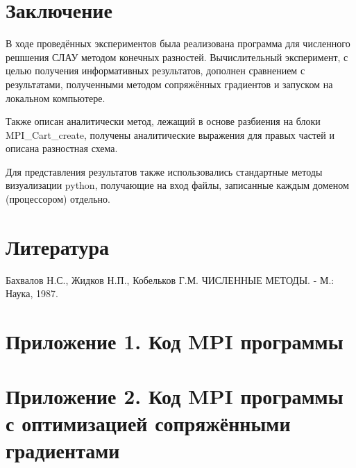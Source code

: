 \documentclass[12pt, fleqn]{article}
\theoremstyle{definition}
\begin{document}
\section{Заключение}
В ходе проведённых экспериментов была реализована программа для численного решшения СЛАУ методом конечных разностей. Вычислительный эксперимент, с целью получения информативных результатов, дополнен сравнением с результатами, полученными методом сопряжённых градиентов и запуском на локальном компьютере.

Также описан аналитически метод, лежащий в основе разбиения на блоки MPI\_Cart\_create, получены аналитические выражения для правых частей и описана разностная схема.

Для представления результатов также использовались стандартные методы визуализации python, получающие на вход файлы, записанные каждым доменом (процессором) отдельно.
\newpage
\section{Литература}
\begin{thebibliography}{}
 Бахвалов Н.С., Жидков Н.П., Кобельков Г.М. ЧИСЛЕННЫЕ МЕТОДЫ. - М.: Наука, 1987.
 
\end{thebibliography}
\newpage
\section{Приложение 1. Код MPI программы}\label{sec:code}
{}
\section{Приложение 2. Код MPI программы с оптимизацией сопряжёнными градиентами}\label{sec:code_cg}
{}
\end{document}
